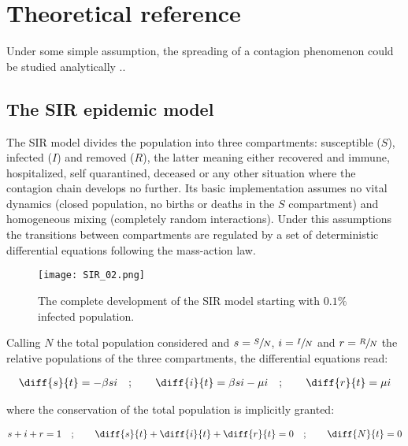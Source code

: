 \documentclass[DIV=12, BCOR=0pt]{scrartcl}  %
\begin{document}
  
  \section{Theoretical reference}
  \label{sec:theory}
  Under some simple assumption, the spreading of a contagion phenomenon could be studied analytically ..
  
  \subsection{The SIR epidemic model}
  The SIR model divides the population into three compartments: susceptible ($S$), infected ($I$) and removed ($R$), the latter meaning either recovered and immune, hospitalized, self quarantined, deceased or any other situation where the contagion chain develops no further. Its basic implementation assumes no vital dynamics (closed population, no births or deaths in the $S$ compartment) and homogeneous mixing (completely random interactions). Under this assumptions the transitions between compartments are regulated by a set of deterministic differential equations following the mass-action law. 
    
  \begin{figure}[h!]
  	\centering
  	\texttt{[image: SIR\_02.png]}
  	\caption{The complete development of the SIR model starting with $0.1\%$ infected population.}
  	\label{fig:SIRoverall}
  \end{figure}

  Calling $N$ the total population considered and $s = \sfrac{S}{N}$, $i = \sfrac{I}{N}$ and $r = \sfrac{R}{N}$ the relative populations of the three compartments, the differential equations read:
  
  \begin{align}
  	\diff{s}{t} = - \beta s i \quad;  \qquad 	\diff{i}{t} = \beta s i - \mu i \quad; \qquad  \diff{r}{t} = \mu i
  	\label{eq:sir}
  \end{align}

  where the conservation of the total population is implicitly granted: %
  
  \begin{align}
  	s + i + r = 1 \quad ; \qquad \diff{s}{t} + \diff{i}{t} + \diff{r}{t} = 0  \quad ; \qquad  \diff{N}{t}= 0
  	\label{eq:sir_sum}
  \end{align}
\end{document}
